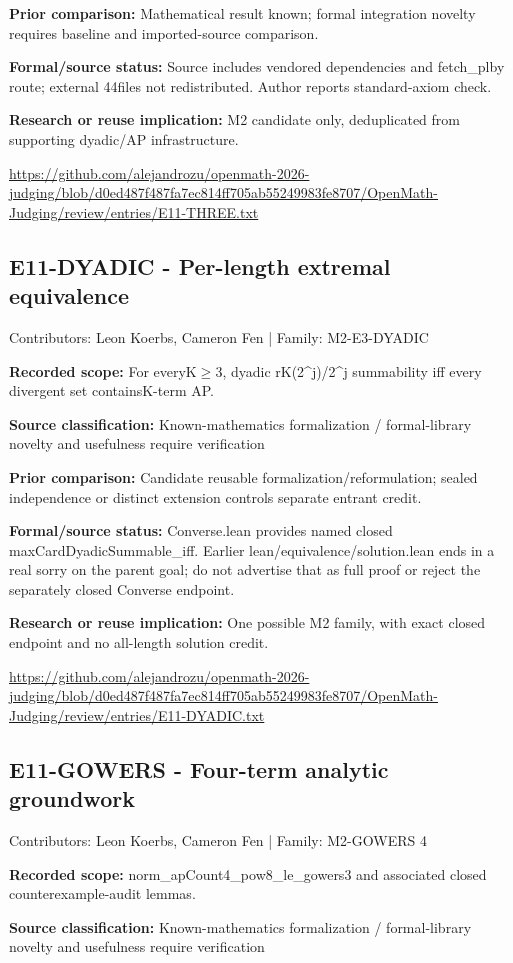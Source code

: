 \documentclass[11pt,a4paper]{article}
\begin{document}
\textbf{Prior comparison:} Mathematical result known; formal integration novelty requires baseline and imported-source comparison.

\textbf{Formal/source status:} Source includes vendored dependencies and fetch\_plby route; external 44files not redistributed. Author reports standard-axiom check.

\textbf{Research or reuse implication:} M2 candidate only, deduplicated from supporting dyadic/AP infrastructure.

{\small \url{https://github.com/alejandrozu/openmath-2026-judging/blob/d0ed487f487fa7ec814ff705ab55249983fe8707/OpenMath-Judging/review/entries/E11-THREE.txt}\par}

\begin{samepage}
\subsection{E11-DYADIC  -  Per-length extremal equivalence}
{\small Contributors: Leon Koerbs, Cameron Fen | Family: M2-E3-DYADIC\par}

\textbf{Recorded scope:} For everyK\ensuremath{\geq}3, dyadic rK(2\textasciicircum{}j)/2\textasciicircum{}j summability iff every divergent set containsK-term AP.

\end{samepage}
\textbf{Source classification:} Known-mathematics formalization / formal-library novelty and usefulness require verification

\textbf{Prior comparison:} Candidate reusable formalization/reformulation; sealed independence or distinct extension controls separate entrant credit.

\textbf{Formal/source status:} Converse.lean provides named closed maxCardDyadicSummable\_iff. Earlier lean/equivalence/solution.lean ends in a real sorry on the parent goal; do not advertise that as full proof or reject the separately closed Converse endpoint.

\textbf{Research or reuse implication:} One possible M2 family, with exact closed endpoint and no all-length solution credit.

{\small \url{https://github.com/alejandrozu/openmath-2026-judging/blob/d0ed487f487fa7ec814ff705ab55249983fe8707/OpenMath-Judging/review/entries/E11-DYADIC.txt}\par}

\begin{samepage}
\subsection{E11-GOWERS  -  Four-term analytic groundwork}
{\small Contributors: Leon Koerbs, Cameron Fen | Family: M2-GOWERS 4\par}

\textbf{Recorded scope:} norm\_apCount4\_pow8\_le\_gowers3 and associated closed counterexample-audit lemmas.

\end{samepage}
\textbf{Source classification:} Known-mathematics formalization / formal-library novelty and usefulness require verification
\end{document}
